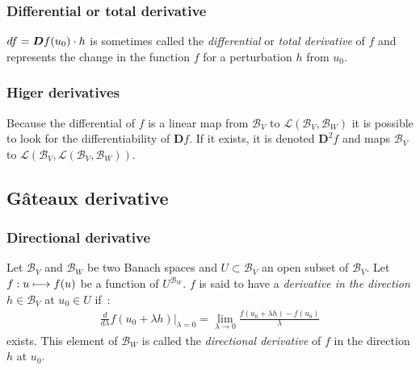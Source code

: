 \subsubsection{Differential or total derivative}

$df = \boldsymbol{D}f(u_0)\cdot h$ is sometimes called the \emph{differential} or \emph{total derivative} of $f$ and represents the change in the function $f$ for a perturbation $h$ from $u_0$.

\subsubsection{Higer derivatives}

Because the differential of $f$ is a linear map from $\mathcal{B}_V$ to $\mathcal{L}(\mathcal{B}_V,{\mathcal{B}_W})$ it is possible to look for the differentiability of $\boldsymbol{D}f$. If it exists, it is denoted $\boldsymbol{D}^2f$ and maps $\mathcal{B}_V$ to $\mathcal{L}(\mathcal{B}_V,\mathcal{L}(\mathcal{B}_V,{\mathcal{B}_W}))$.

\subsection{Gâteaux derivative}
\subsubsection{Directional derivative}
Let $\mathcal{B}_V$ and $\mathcal{B}_W$ be two Banach spaces and $U \subset \mathcal{B}_V$ an open subset of $\mathcal{B}_V$.
Let $f : u \longmapsto f(u)$ be a function of  $U^{\mathcal{B}_W}$.
$f$ is said to have a \emph{derivative in the direction} $h\in\mathcal{B}_V$ at $u_0\in U$ if~:
\begin{align}
\frac{d}{d\lambda}f(u_0+\lambda h)\Bigr|_{\lambda = 0} = \lim_{\lambda \to 0} \frac{f(u_0+\lambda h) - f(u_0)}{\lambda}
\end{align}
exists. This element of $\mathcal{B}_W$ is called the \emph{directional derivative} of $f$ in the direction $h$ at $u_0$.

